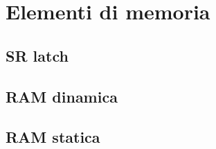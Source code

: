 \section{Elementi di memoria}
\subsection{SR latch}
\subsection{RAM dinamica}
\subsection{RAM statica}